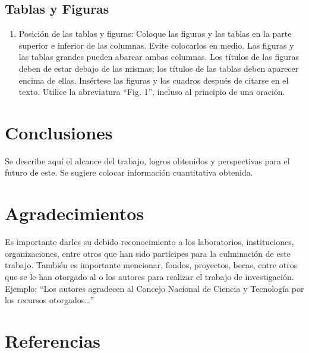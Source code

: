 \subsection{Tablas y Figuras}

\begin{enumerate}
    \item Posición de las tablas y figuras: Coloque las figuras y las tablas en la parte superior e inferior de las columnas. Evite colocarlos en medio. Las figuras y las tablas grandes pueden abarcar ambas columnas. Los títulos de las figuras deben de estar debajo de las mismas; los títulos de las tablas deben aparecer encima de ellas. Insértese las figuras y los cuadros después de citarse en el texto. Utilice la abreviatura “Fig. 1”, incluso al principio de una oración. 
\end{enumerate}

\section{Conclusiones}

Se describe aquí el alcance del trabajo, logros obtenidos y perspectivas para el futuro de este. Se sugiere colocar información cuantitativa obtenida.

\section{Agradecimientos}

Es importante darles su debido reconocimiento a los laboratorios, instituciones, organizaciones, entre otros que han sido partícipes para la culminación de este trabajo. También es importante mencionar, fondos, proyectos, becas, entre otros que se le han otorgado al o los autores para realizar el trabajo de investigación. Ejemplo: “Los autores agradecen al Concejo Nacional de Ciencia y Tecnología por los recursos otorgados…”

\section*{Referencias}

